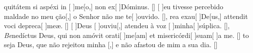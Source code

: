 {    %
    {quitátem si aspéxi in [ ]{me}[o,] non ex[ ]{Dómi}\-nus. [\LinkLA]}%
        {[ ]{eu} tivesse percebido maldade no meu  {ção}[,] o Senhor não me te[ ]{ou}{vi}do. [\LinkPT]},
    {rea exau[ ]{De}[us,] attendit voci depreca[ ]{me}æ. [\LinkLA]}%
        {[ ]{Deus} [ ]{ou}{viu}[,] atendeu à voz [ ]{mi}{nha}[ ]{súpli}ca. [\LinkPT]},
    {\textit{Be}{ne}díctus Deus, qui non amóvit orati[ ]{me}[am] et misericórdi[ ]{su}{am}[ ]{a} me. [\LinkLA]}%
        {to seja Deus, que não rejeitou minha [,] e não afastou de mim a sua dia. [\LinkPT]}
}